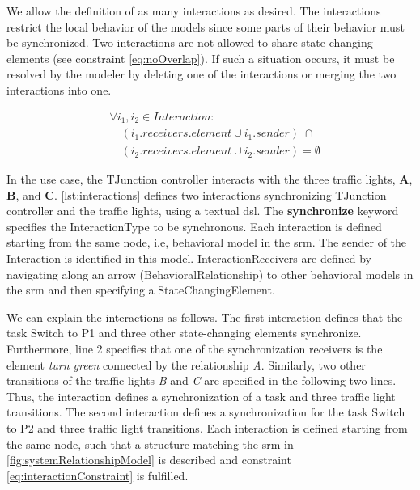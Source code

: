 \documentclass{jot}
\begin{document}
We allow the definition of as many interactions as desired.
The interactions restrict the local behavior of the models since some parts of their behavior must be synchronized.
Two interactions are not allowed to share state-changing elements (see constraint \eqref{eq:noOverlap}).
If such a situation occurs, it must be resolved by the modeler by deleting one of the interactions or merging the two interactions into one.

\begin{equation} \label{eq:noOverlap}
    \begin{aligned}
    & \forall i_1,i_2 \in Interaction : \\
    & \quad (i_1.receivers.element \cup i_1.sender) \; \cap \\
    & \quad (i_2.receivers.element \cup i_2.sender) = \emptyset
    \end{aligned}
\end{equation}

In the use case, the TJunction controller interacts with the three traffic lights, \textbf{A}, \textbf{B}, and \textbf{C}.
\autoref{lst:interactions} defines two interactions synchronizing TJunction controller and the traffic lights, using a textual \gls*{dsl}.
The \textbf{synchronize} keyword specifies the \textsf{InteractionType} to be \textsf{synchronous}.
Each interaction is defined starting from the same node, i.e, behavioral model in the \gls*{srm}.
The \textsf{sender} of the \textsf{Interaction} is identified in this model. 
\textsf{InteractionReceiver}s are defined by navigating along an arrow (\textsf{BehavioralRelationship}) to other behavioral models in the \gls*{srm} and then specifying a \textsf{StateChangingElement}.



We can explain the interactions as follows.
The first interaction defines that the task \textsf{Switch to P1} and three other state-changing elements synchronize.
Furthermore, line 2 specifies that one of the synchronization receivers is the element \emph{turn green} connected by the relationship \emph{A}.
Similarly, two other transitions of the traffic lights \emph{B} and \emph{C} are specified in the following two lines.
Thus, the interaction defines a synchronization of a task and three traffic light transitions. 
The second interaction defines a synchronization for the task \textsf{Switch to P2} and three traffic light transitions.
Each interaction is defined starting from the same node, such that a structure matching the \gls*{srm} in \autoref{fig:systemRelationshipModel} is described and constraint \eqref{eq:interactionConstraint} is fulfilled.
\end{document}
